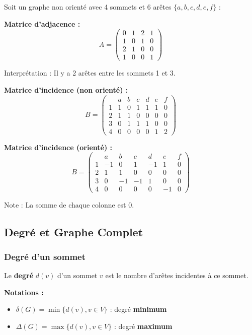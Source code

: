 \documentclass[12pt,a4paper]{article}
\begin{document}
\begin{exemple}
Soit un graphe non orienté avec 4 sommets et 6 arêtes $\{a, b, c, d, e, f\}$ :

\textbf{Matrice d'adjacence :}
$$A = \begin{pmatrix}
0 & 1 & 2 & 1\\
1 & 0 & 1 & 0\\
2 & 1 & 0 & 0\\
1 & 0 & 0 & 1
\end{pmatrix}$$

Interprétation : Il y a 2 arêtes entre les sommets 1 et 3.

\textbf{Matrice d'incidence (non orienté) :}
$$B = \begin{pmatrix}
    & a & b & c & d & e & f\\
1 & 1 & 0 & 1 & 1 & 1 & 0\\
2 & 1 & 1 & 0 & 0 & 0 & 0\\
3 & 0 & 1 & 1 & 1 & 0 & 0\\
4 & 0 & 0 & 0 & 0 & 1 & 2
\end{pmatrix}$$

\textbf{Matrice d'incidence (orienté) :}
$$B = \begin{pmatrix}
    & a & b & c & d & e & f\\
1 & -1 & 0 & 1 & -1 & 1 & 0\\
2 & 1 & 1 & 0 & 0 & 0 & 0\\
3 & 0 & -1 & -1 & 1 & 0 & 0\\
4 & 0 & 0 & 0 & 0 & -1 & 0
\end{pmatrix}$$

Note : La somme de chaque colonne est 0.
\end{exemple}

\newpage
\subsection{Degré et Graphe Complet}

\subsubsection{Degré d'un sommet}

\begin{definition}
Le \textbf{degré} $d(v)$ d'un sommet $v$ est le nombre d'arêtes incidentes à ce sommet.

\textbf{Notations :}
\begin{itemize}
    \item $\delta(G) = \min\{d(v), v \in V\}$ : degré \textcolor{titrebleu}{\textbf{minimum}}
    \item $\Delta(G) = \max\{d(v), v \in V\}$ : degré \textcolor{defvert}{\textbf{maximum}}
\end{itemize}
\end{definition}
\end{document}

